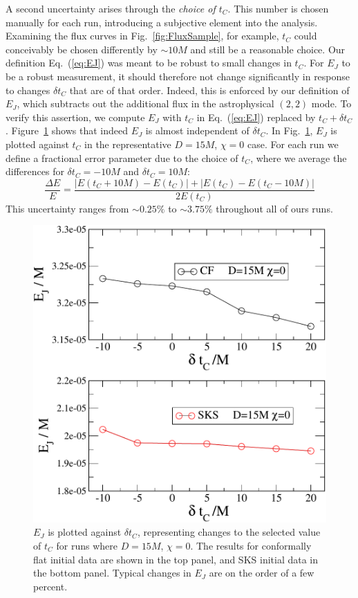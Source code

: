 A second uncertainty arises through the {\it choice of $t_C$}.
This number is chosen manually for
each run, introducing a
  subjective element into the analysis. Examining the flux curves in
Fig.~\ref{fig:FluxSample}, for example, $t_C$ could conceivably be
chosen differently by $\sim 10 M$ and still be a
reasonable choice. {Our definition Eq.~(\ref{eq:EJ}) was meant
to be robust to small changes in $t_C$.  For $E_J$ to be a robust measurement, it should
therefore not change significantly in response to changes $\delta t_C$
that are of that order. Indeed, this is enforced by our definition of
$E_J$, which subtracts out the additional flux in the astrophysical
$(2,2)$ mode.}  To verify this assertion, we compute $E_J$ with $t_C$ in Eq.~(\ref{eq:EJ}) replaced by $t_C+\delta t_C$.  Figure~\ref{fig:EvsDtC} shows that indeed $E_J$ is almost independent of $\delta t_C$.  
In Fig.~\ref{fig:EvsDtC}, $E_J$ is plotted against $t_C$
in the representative $D=15M$, $\chi=0$ case.
For each run we define a fractional
error parameter due to the choice of $t_C$, where we average the
differences for $\delta t_C = -10M$ and $\delta t_C = 10M$:
\begin{equation}
\frac{\Delta E}{E} = \frac{|E(t_C+10M) - E(t_C)| + |E(t_C) - E(t_C -
  10M)|}{2E(t_C)}
\end{equation}
This uncertainty ranges from $\sim 0.25\%$ to $\sim 3.75\%$ throughout
all of ours runs.

\begin{figure}
 \includegraphics[width=0.95\columnwidth]{chap5/EvsDtj}
  \caption[$E_J$ as a function of $\delta t_C$.]{$E_J$ is plotted against $\delta t_C$, representing changes
    to the selected value of $t_C$ for runs where $D=15M$,
    $\chi=0$. The results for conformally flat initial data are shown
    in the top panel, and SKS initial data in the bottom
    panel. Typical changes in $E_J$ are on the order of a few
    percent.}
 \label{fig:EvsDtC}
\end{figure}


